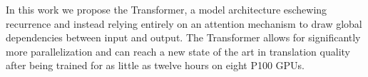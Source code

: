 \documentclass{article}
\begin{document}
In this work we propose the Transformer, a model architecture eschewing recurrence and instead relying entirely on an attention mechanism to draw global dependencies between input and output. The Transformer allows for significantly more parallelization and can reach a new state of the art in translation quality after being trained for as little as twelve hours on eight P100 GPUs. 

\end{document}

